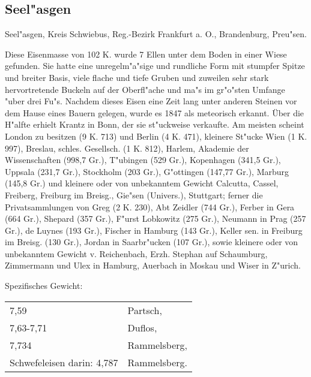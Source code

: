 \documentclass[a4paper, 11pt, oneside]{article}
\begin{document}
\subsection{Seel"asgen}

Seel"asgen, Kreis Schwiebus, Reg.-Bezirk Frankfurt a. O., Brandenburg, Preu"sen.

Diese Eisenmasse von 102 K. wurde 7 Ellen unter dem Boden in einer Wiese gefunden. Sie hatte eine unregelm"a"sige und rundliche Form mit stumpfer Spitze und breiter Basis, viele flache und tiefe Gruben und zuweilen sehr stark hervortretende Buckeln auf der Oberfl"ache und ma"s im gr"o"sten Umfange "uber drei Fu"s. Nachdem dieses Eisen eine Zeit lang unter anderen Steinen vor dem Hause eines Bauern gelegen, wurde es 1847 als meteorisch erkannt. Über die H"alfte erhielt Krantz in Bonn, der sie st"uckweise verkaufte. Am meisten scheint London zu besitzen (9 K. 713) und Berlin (4 K. 471), kleinere St"ucke Wien (1 K. 997), Breslau, schles. Gesellsch. (1 K. 812), Harlem, Akademie der Wissenschaften (998,7 Gr.), T"ubingen (529 Gr.), Kopenhagen (341,5 Gr.), Uppsala (231,7 Gr.), Stockholm (203 Gr.), G"ottingen (147,77 Gr.), Marburg (145,8 Gr.) und kleinere oder von unbekanntem Gewicht Calcutta, Cassel, Freiberg, Freiburg im Breisg., Gie"sen (Univers.), Stuttgart; ferner die Privatsammlungen von Greg (2 K. 230), Abt Zeidler (744 Gr.), Ferber in Gera (664 Gr.), Shepard (357 Gr.), F"urst Lobkowitz (275 Gr.), Neumann in Prag (257 Gr.), de Luynes (193 Gr.), Fischer in Hamburg (143 Gr.), Keller sen. in Freiburg im Breisg. (130 Gr.), Jordan in Saarbr"ucken (107 Gr.), sowie kleinere oder von unbekanntem Gewicht v. Reichenbach, Erzh. Stephan auf Schaumburg, Zimmermann und Ulex in Hamburg, Auerbach in Moskau und Wiser in Z"urich.

Spezifisches Gewicht:  
\begin{table}[!ht]
    \centering
    \begin{tabular}{l l}
        7,59 & Partsch,\\
        7,63-7,71 & Duflos,\\
        7,734 & Rammelsberg,\\
        Schwefeleisen darin: 4,787 & Rammelsberg.
    \end{tabular}
\end{table}
\end{document}
